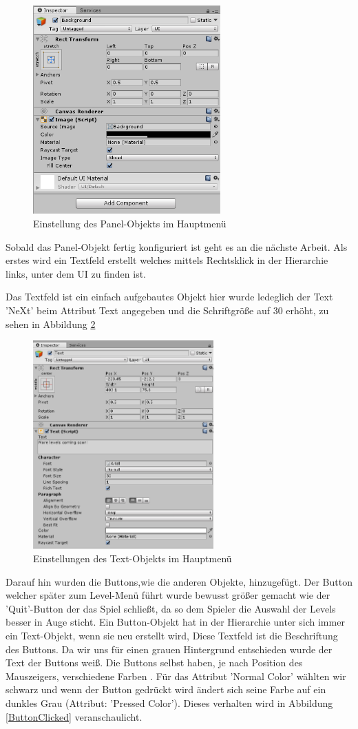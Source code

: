 \begin{figure}[H]
	\centering
	\includegraphics[height=8cm]{images/PanelSetup.png}
	\caption{Einstellung des Panel-Objekts im Hauptmenü}
	\label{PanelSetup}
\end{figure}

Sobald das Panel-Objekt fertig konfiguriert ist geht es an die nächste Arbeit. Als erstes wird ein Textfeld erstellt welches mittels Rechtsklick in der Hierarchie links, unter dem UI zu finden ist.

Das Textfeld ist ein einfach aufgebautes Objekt hier wurde ledeglich der Text 'NeXt' beim Attribut Text angegeben und die Schriftgröße auf 30 erhöht, zu sehen in Abbildung \ref{TextSetupMainMenu}
\begin{figure}[H]
	\centering
	\includegraphics[height=8cm]{images/MainMenuTextSetup.png}
	\caption{Einstellungen des Text-Objekts im Hauptmenü}
	\label{TextSetupMainMenu}
\end{figure}
 Darauf hin wurden die Buttons,wie die anderen Objekte, hinzugefügt. Der Button welcher später zum Level-Menü führt wurde bewusst größer gemacht wie der 'Quit'-Button der das Spiel schließt, da so dem Spieler die Auswahl der Levels besser in Auge sticht. Ein Button-Objekt hat in der Hierarchie unter sich immer ein Text-Objekt, wenn sie neu erstellt wird, Diese Textfeld ist die Beschriftung des Buttons. Da wir uns für einen grauen Hintergrund entschieden wurde der Text der Buttons weiß. Die Buttons selbst haben, je nach Position des Mauszeigers, verschiedene Farben . Für das Attribut 'Normal Color' wählten wir schwarz und wenn der Button gedrückt wird ändert sich seine Farbe auf ein dunkles Grau (Attribut: 'Pressed Color'). Dieses verhalten wird in Abbildung \ref{ButtonClicked} veranschaulicht.
 
